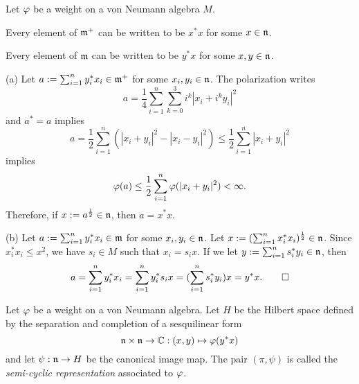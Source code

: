 \documentclass{../../../small}
\begin{document}
\begin{prop}
Let $\varphi$ be a weight on a von Neumann algebra $M$.
\begin{parts}
\item Every element of $\mathfrak{m}^+$ can be written to be $x^*x$ for some $x\in\mathfrak{n}$.
\item Every element of $\mathfrak{m}$ can be written to be $y^*x$ for some $x,y\in\mathfrak{n}$.
\end{parts}
\end{prop}
\begin{pf}
(a)
Let $a:=\sum_{i=1}^ny_i^*x_i\in\mathfrak{m}^+$ for some $x_i,y_i\in\mathfrak{n}$.
The polarization writes
\[a=\frac14\sum_{i=1}^n\sum_{k=0}^3i^k|x_i+i^ky_i|^2\]
and $a^*=a$ implies
\[a=\frac12\sum_{i=1}^n(|x_i+y_i|^2-|x_i-y_i|^2)\le\frac12\sum_{i=1}^n|x_i+y_i|^2\]
implies
\[\varphi(a)\le\frac12\sum_{i=1}^n\varphi(|x_i+y_i|^2)<\infty.\]
Therefore, if $x:=a^{\frac12}\in\mathfrak{n}$, then $a=x^*x$.

(b)
Let $a:=\sum_{i=1}^ny_i^*x_i\in\mathfrak{m}$ for some $x_i,y_i\in\mathfrak{n}$.
Let $x:=(\sum_{i=1}^nx_i^*x_i)^{\frac12}\in\mathfrak{n}$.
Since $x_i^*x_i\le x^2$, we have $s_i\in M$ such that $x_i=s_ix$.
If we let $y:=\sum_{i=1}^ns_i^*y_i\in\mathfrak{n}$, then
\[a=\sum_{i=1}^ny_i^*x_i=\sum_{i=1}^ny_i^*s_ix=(\sum_{i=1}^ns_i^*y_i)x=y^*x.\qedhere\]
\end{pf}


\begin{defn}
Let $\varphi$ be a weight on a von Neumann algebra.
Let $H$ be the Hilbert space defined by the separation and completion of a sesquilinear form
\[\mathfrak{n}\times\mathfrak{n}\to\mathbb{C}:(x,y)\mapsto\varphi(y^*x)\]
and let $\psi:\mathfrak{n}\to H$ be the canonical image map.
The pair $(\pi,\psi)$ is called the \emph{semi-cyclic representation} associated to $\varphi$.
\end{defn}
\end{document}
